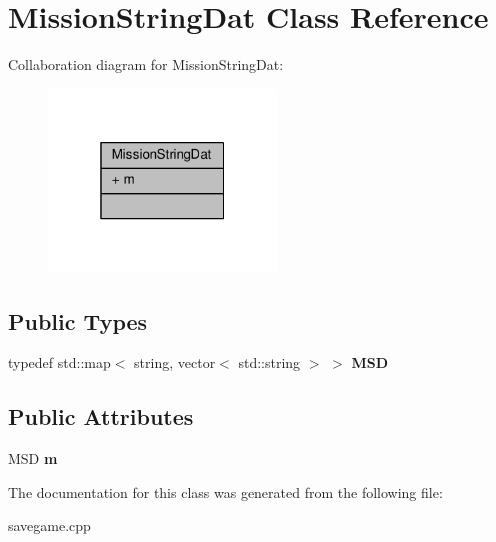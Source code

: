 \hypertarget{classMissionStringDat}{}\section{Mission\+String\+Dat Class Reference}
\label{classMissionStringDat}


Collaboration diagram for Mission\+String\+Dat\+:
\nopagebreak
\begin{figure}[H]
\begin{center}
\leavevmode
\includegraphics[width=172pt]{d9/da6/classMissionStringDat__coll__graph}
\end{center}
\end{figure}
\subsection*{Public Types}
\begin{DoxyCompactItemize}
\item 
typedef std\+::map$<$ string, vector$<$ std\+::string $>$ $>$ {\bfseries M\+SD}\hypertarget{classMissionStringDat_a69eb1766bf0e6cf20e4845f01e185e11}{}\label{classMissionStringDat_a69eb1766bf0e6cf20e4845f01e185e11}

\end{DoxyCompactItemize}
\subsection*{Public Attributes}
\begin{DoxyCompactItemize}
\item 
M\+SD {\bfseries m}\hypertarget{classMissionStringDat_a2e66f528e52354100f24cf1d928ec9b4}{}\label{classMissionStringDat_a2e66f528e52354100f24cf1d928ec9b4}

\end{DoxyCompactItemize}


The documentation for this class was generated from the following file\+:\begin{DoxyCompactItemize}
\item 
savegame.\+cpp\end{DoxyCompactItemize}
